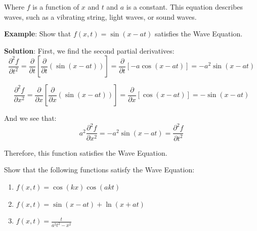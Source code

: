 Where $f$ is a function of $x$ and $t$ and $a$ is a constant. This equation 
describes waves, such as a vibrating string, light waves, or sound waves. 

\textbf{Example}: Show that $f(x, t) = \sin{ \left( x - at \right)}$ satisfies 
the Wave Equation. 

\textbf{Solution}: First, we find the second partial derivatives:
$$\frac{\partial^2 f}{\partial t^2} = \frac{\partial}{\partial t} \left[ \frac{
\partial}{\partial t} \left( \sin{ \left( x - at \right)} \right) \right] = 
\frac{\partial}{\partial t} \left[ -a\cos{\left(x - at \right)} \right] = -a^2
\sin{\left(x - at \right)}$$

$$\frac{\partial^2 f}{\partial x^2} = \frac{\partial}{\partial x} \left[ \frac{
\partial}{\partial x} \left( \sin{ \left( x - at \right)} \right) \right] = 
\frac{\partial}{\partial x} \left[ \cos{\left( x - at \right)}\right] = -\sin{
\left( x - at \right)}$$

And we see that:
$$a^2 \frac{\partial^2 f}{\partial x^2} = -a^2 \sin{\left(x - at \right)} = 
\frac{\partial^2 f}{\partial t^2}$$

Therefore, this function satisfies the Wave Equation. 

\begin{Exercise}[title = {The Wave Equation}, label = wave]
Show that the following functions satisfy the Wave Equation:
\begin{enumerate}
    \item $f(x, t) = \cos{\left(kx \right)}\cos{\left(akt \right)}$
    \item $f(x, t) = \sin{\left( x - at \right)} + \ln{ \left( x + at 
    \right)}$
    \item $f(x, t) = \frac{t}{a^2t^2 - x^2}$
\end{enumerate}
\vspace{50mm}
\end{Exercise}

